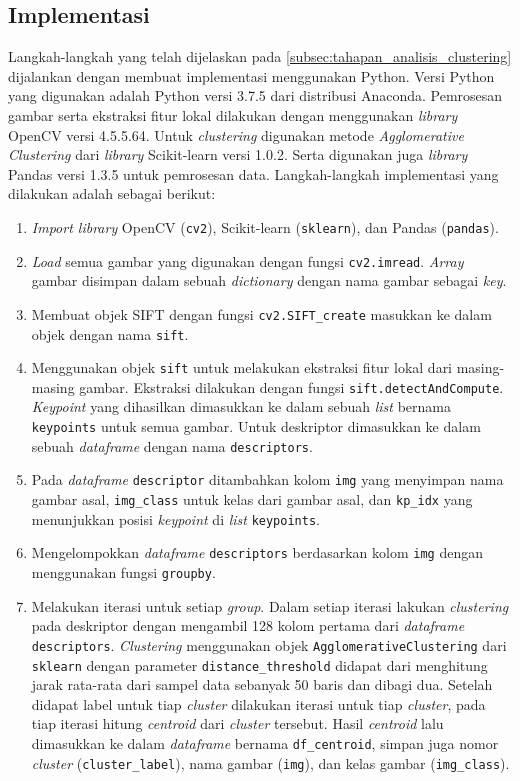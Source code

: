\subsection{Implementasi}
\label{subsec:tahapan_implementasi_analisis_clustering}
Langkah-langkah yang telah dijelaskan pada \ref{subsec:tahapan_analisis_clustering} dijalankan dengan membuat implementasi menggunakan Python. Versi Python yang digunakan adalah Python versi 3.7.5 dari distribusi Anaconda. Pemrosesan gambar serta ekstraksi fitur lokal dilakukan dengan menggunakan \textit{library} OpenCV versi 4.5.5.64. Untuk \textit{clustering} digunakan metode \textit{Agglomerative Clustering} dari \textit{library} Scikit-learn versi 1.0.2. Serta digunakan juga \textit{library} Pandas versi 1.3.5 untuk pemrosesan data. Langkah-langkah implementasi yang dilakukan adalah sebagai berikut:
\begin{enumerate}
	\item \textit{Import library} OpenCV (\texttt{cv2}), Scikit-learn (\texttt{sklearn}), dan Pandas (\texttt{pandas}).
	\item \textit{Load} semua gambar yang digunakan dengan fungsi \texttt{cv2.imread}. \textit{Array} gambar disimpan dalam sebuah \textit{dictionary} dengan nama gambar sebagai \textit{key}.
	\item Membuat objek SIFT dengan fungsi \texttt{cv2.SIFT\_create} masukkan ke dalam objek dengan nama \texttt{sift}.
	\item Menggunakan objek \texttt{sift} untuk melakukan ekstraksi fitur lokal dari masing-masing gambar. Ekstraksi dilakukan dengan fungsi \texttt{sift.detectAndCompute}. \textit{Keypoint} yang dihasilkan dimasukkan ke dalam sebuah \textit{list} bernama \texttt{keypoints} untuk semua gambar. Untuk deskriptor dimasukkan ke dalam sebuah \textit{dataframe} dengan nama \texttt{descriptors}.
	\item Pada \textit{dataframe} \texttt{descriptor} ditambahkan kolom \texttt{img} yang menyimpan nama gambar asal, \texttt{img\_class} untuk kelas dari gambar asal, dan \texttt{kp\_idx} yang menunjukkan posisi \textit{keypoint} di \textit{list} \texttt{keypoints}.
	\item Mengelompokkan \textit{dataframe} \texttt{descriptors} berdasarkan kolom \texttt{img} dengan menggunakan fungsi \texttt{groupby}.
	\item Melakukan iterasi untuk setiap \textit{group}. Dalam setiap iterasi lakukan \textit{clustering} pada deskriptor dengan mengambil 128 kolom pertama dari \textit{dataframe} \texttt{descriptors}. \textit{Clustering} menggunakan objek \texttt{AgglomerativeClustering} dari \texttt{sklearn} dengan parameter \texttt{distance\_threshold} didapat dari menghitung jarak rata-rata dari sampel data sebanyak 50 baris dan dibagi dua. Setelah didapat label untuk tiap \textit{cluster} dilakukan iterasi untuk tiap \textit{cluster}, pada tiap iterasi hitung \textit{centroid} dari \textit{cluster} tersebut. Hasil \textit{centroid} lalu dimasukkan ke dalam \textit{dataframe} bernama \texttt{df\_centroid}, simpan juga nomor \textit{cluster} (\texttt{cluster\_label}), nama gambar (\texttt{img}), dan kelas gambar (\texttt{img\_class}).

\end{enumerate}
